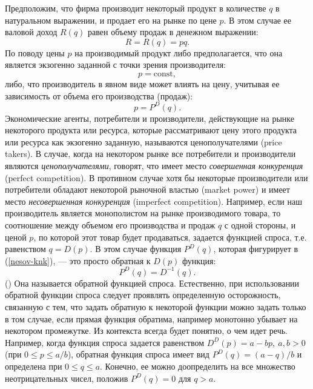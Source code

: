     Предположим, что фирма производит некоторый продукт в количестве
    $q$ в натуральном выражении, и
    продает его на рынке по цене $p$. В этом случае ее валовой доход
    $R(q)$ равен объему продаж в денежном выражении:
\begin{equation}
\label{val-prod}
    R=R(q)=pq.
\end{equation}
    По поводу цены $p$ на производимый продукт либо предполагается,
    что она является экзогенно заданной с точки зрения
    производителя:
\begin{equation}
\label{sov-knk}
    p=\text{const},
\end{equation}
    либо, что производитель в явном виде может влиять на цену,
    учитывая ее зависимость от объема его производства (продаж):
\begin{equation}
\label{nesov-knk}
    p=P^{D}(q).
\end{equation}
    Экономические агенты, потребители и производители, действующие
    на рынке некоторого продукта или ресурса, которые рассматривают
    цену этого продукта или ресурса как экзогенно заданную,
    называются ценополучателями (price takers). В случае, когда на
    некотором рынке все потребители и производители являются
    \emph{ценополучателями}, говорят, что имеет место
    \emph{совершенная конкуренция} (perfect competition). В противном
    случае хотя бы некоторые производители или потребители обладают некоторой рыночной
    властью (market power) и имеет место \emph{несовершенная конкуренция}
    (imperfect competition). Например, если наш производитель
    является монополистом на рынке производимого товара, то
    соотношение между объемом его производства и продаж $q$ с одной
    стороны, и ценой $p$, по которой этот товар будет продаваться,
    задается функцией спроса, т.е. равенством $q=D(p)$. В
    этом случае функция $P^{D}(q)$, которая фигурирует в
    (\ref{nesov-knk}), --- это просто обратная к $D(p)$ функция:
    \[P^{D}(q)=D^{-1}(q).\]    ()
    Она называется обратной функцией спроса. Естественно, при
    использовании обратной функции спроса следует проявлять
    определенную осторожность, связанную с тем, что задать обратную
    к некоторой функции можно задать только в том случае, если прямая
    функция обратима, например
    монотонно убывает на некотором промежутке. Из контекста всегда
    будет понятно, о чем идет речь.
    Например, когда функция спроса задается равенством
    $D^{D}(p)=a-bp, \ a, b>0$ (при
    $0\leqslant p\leqslant a/b$),
    обратная функция спроса имеет вид
    $P^{D}(q)=(a-q)/b$ и определена при $0\leqslant q\leqslant a$. Конечно, ее
    можно доопределить на все множество неотрицательных чисел,
    положив $P^{D}(q)=0$ для $q>a$.




